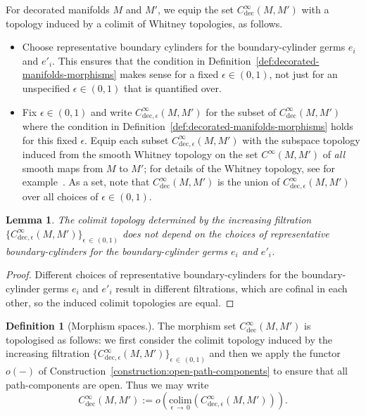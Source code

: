 \documentclass[10pt,a4paper]{amsart}
\numberwithin{equation}{section}
\newcommand{\colim}{\mathrm{colim}}
\newcommand{\rdec}{\mathrm{dec}}
\newtheorem{lemm}[theo]{Lemma}
\theoremstyle{definition}
\newtheorem{defi}[theo]{Definition}
\theoremstyle{remark}
\begin{document}
For decorated manifolds $M$ and $M'$, we equip the set $C^\infty_{\rdec}(M,M')$ with a topology induced by a colimit of Whitney topologies, as follows.
\begin{itemize}
\item Choose representative boundary cylinders for the boundary-cylinder germs $e_{i}$ and $e'_{i}$. This ensures that the condition in Definition~\ref{def:decorated-manifolds-morphisms} makes sense for a fixed $\epsilon \in (0,1)$, not just for an unspecified $\epsilon \in (0,1)$ that is quantified over.
\item Fix $\epsilon \in (0,1)$ and write $C^\infty_{\rdec,\epsilon}(M,M')$ for the subset of $C^\infty_{\rdec}(M,M')$ where the condition in Definition~\ref{def:decorated-manifolds-morphisms} holds for this fixed $\epsilon$. Equip each subset $C^\infty_{\rdec,\epsilon}(M,M')$ with the subspace topology induced from the smooth Whitney topology on the set $C^\infty(M,M')$ of \emph{all} smooth maps from $M$ to $M'$; for details of the Whitney topology, see for example~\cite[Chap.~2]{Hirsch1976Differentialtopology}. As a set, note that $C^\infty_{\rdec}(M,M')$ is the union of $C^\infty_{\rdec,\epsilon}(M,M')$ over all choices of $\epsilon \in (0,1)$.
\end{itemize}

\begin{lemm}\label{lem:topology_well_defined}
The colimit topology determined by the increasing filtration $\{ C^\infty_{\rdec,\epsilon}(M,M') \}_{\epsilon\,\in\,(0,1)}$ does not depend on the choices of representative boundary-cylinders for the boundary-cylinder germs $e_{i}$ and $e'_{i}$.
\end{lemm}

\begin{proof}
Different choices of representative boundary-cylinders for the boundary-cylinder germs $e_{i}$ and $e'_{i}$ result in different filtrations, which are cofinal in each other, so the induced colimit topologies are equal.
\end{proof}

\begin{defi}[Morphism spaces.]\label{def:decorated-manifolds-morphism-spaces}
The morphism set $C^\infty_{\rdec}(M,M')$ is topologised as follows: we first consider the colimit topology induced by the increasing filtration $\{ C^\infty_{\rdec,\epsilon}(M,M') \}_{\epsilon\,\in\,(0,1)}$ and then we apply the functor $o(-)$ of Construction~\ref{construction:open-path-components} to ensure that all path-components are open. Thus we may write
\[
C^\infty_{\rdec}(M,M') := o\left(\underset{\epsilon\,\to\,0}{\colim}(C^\infty_{\rdec,\epsilon}(M,M'))\right).
\]
\end{defi}
\end{document}

